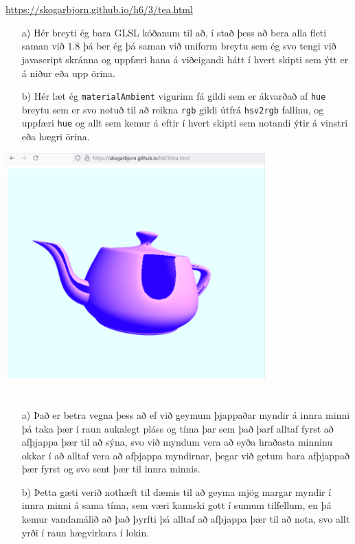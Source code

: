 \documentclass{article}
\begin{document}
	\section{}
	\url{https://skogarbjorn.github.io/h6/3/tea.html}
	\begin{itemize}
		\item[a)] Hér breyti ég bara GLSL kóðanum til að, í stað þess að 
			bera alla fleti saman við $1.8$ þá ber ég þá saman við 
			uniform breytu sem ég svo tengi við javascript skránna og 
			uppfæri hana á viðeigandi hátt í hvert skipti sem ýtt er á 
			niður eða upp örina.
		\item[b)] Hér læt ég \texttt{materialAmbient} vigurinn fá gildi 
			sem er ákvarðað af \texttt{hue} breytu sem er svo notuð til að 
			reikna \texttt{rgb} gildi útfrá \texttt{hsv2rgb} fallinu, og 
			uppfæri \texttt{hue} og allt sem kemur á eftir í hvert skipti 
			sem notandi ýtir á vinstri eða hægri örina.
	\end{itemize}

	\begin{center}
		\includegraphics[width=0.75\textwidth]{tea.png}
	\end{center}

	\section{}
	\begin{itemize}
		\item[a)] Það er betra vegna þess að ef við geymum þjappaðar 
			myndir á innra minni þá taka þær í raun aukalegt pláss og tíma 
			þar sem það þarf alltaf fyrst að afþjappa þær til að sýna, 
			svo við myndum vera að eyða hraðasta minninu okkar í að alltaf 
			vera að afþjappa myndirnar, þegar við getum bara afþjappað þær 
			fyrst og svo sent þær til innra minnis.
		\item[b)] Þetta gæti verið nothæft til dæmis til að geyma mjög 
			margar myndir í innra minni á sama tíma, sem væri kannski gott 
			í sumum tilfellum, en þá kemur vandamálið að það þyrfti þá 
			alltaf að afþjappa þær til að nota, svo allt yrði í raun 
			hægvirkara í lokin.
	\end{itemize}
\end{document}
